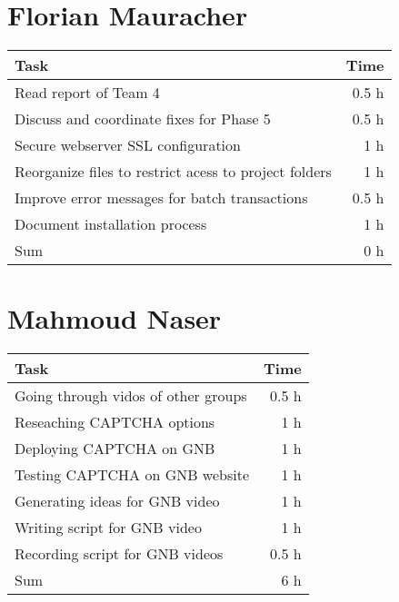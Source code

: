 \section*{Florian Mauracher}
\begin{table}[h!tpb]
  \centering
  \begin{tabularx}{\textwidth}{X r}
    \toprule
      Task & Time \\
    \midrule
      Read report of Team 4 & 0.5 h \\
      Discuss and coordinate fixes for Phase 5  & 0.5 h \\
      Secure webserver SSL configuration & 1 h \\
      Reorganize files to restrict acess to project folders & 1 h \\
      Improve error messages for batch transactions & 0.5 h \\
      Document installation process & 1 h \\
    \midrule
      Sum & 0 h \\
    \bottomrule
  \end{tabularx}
\end{table}

\clearpage
\section*{Mahmoud Naser}
\begin{table}[h!tpb]
  \centering
  \begin{tabularx}{\textwidth}{X r}
    \toprule
      Task & Time \\
    \midrule
      Going through vidos of other groups & 0.5 h \\
      Reseaching CAPTCHA options & 1 h \\
      Deploying CAPTCHA on GNB & 1 h \\
      Testing CAPTCHA on GNB website & 1 h \\
      Generating ideas for GNB video & 1 h \\
      Writing script for GNB video & 1 h \\
      Recording script for GNB videos & 0.5 h\\ 
    \midrule
      Sum & 6 h \\
    \bottomrule
  \end{tabularx}
\end{table}
